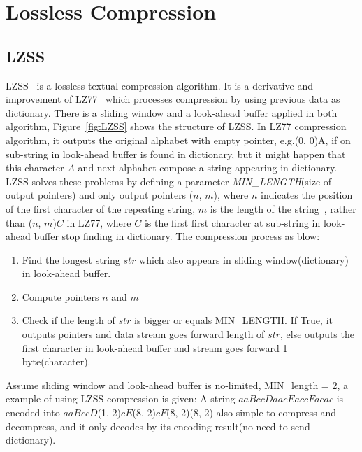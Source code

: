 \section{Lossless Compression}
\subsection{LZSS}
LZSS~\cite{storer1982data} is a lossless textual compression algorithm. It is a
derivative and improvement of LZ77~\cite{ziv1977universal} which processes
compression by using previous data as dictionary. There is a sliding window and
a look-ahead buffer applied in both algorithm, Figure~\ref{fig:LZSS} shows the
structure of LZSS. In LZ77 compression algorithm, it outputs the original
alphabet with empty pointer, e.g.(0, 0)A, if on sub-string in look-ahead buffer
is found in dictionary\cite{ziv1977universal}, but it might happen that this
character $A$ and next alphabet compose a string appearing in dictionary. LZSS
solves these problems by defining a parameter \emph{MIN\_LENGTH}(size of output
pointers) and only output pointers ($n$, $m$), where $n$ indicates the position
of the first character of the repeating string, $m$ is the length of the
string~\cite{storer1982data}, rather than ($n$, $m$)$C$ in LZ77, where $C$ is
the first first character at sub-string in look-ahead buffer stop finding in
dictionary. The compression process as blow:

\begin{enumerate}
    \item Find the longest string $str$ which also appears in sliding
    window(dictionary) in look-ahead buffer.
    \item Compute pointers $n$ and $m$
    \item Check if the length of $str$ is bigger or equals MIN\_LENGTH. If True,
    it outputs pointers and data stream goes forward length of $str$, else
    outputs the first character in look-ahead buffer and stream goes forward 1
    byte(character).
\end{enumerate}

Assume sliding window and look-ahead buffer is no-limited, MIN\_length = 2, a
example of using LZSS compression is given: A string $aaBccDaacEaccFacac$ is
encoded into $aaBccD$(1, 2)$cE$(8, 2)$cF$(8, 2)(8, 2) also simple to compress
and decompress, and it only decodes by its encoding result(no need to send
dictionary).

